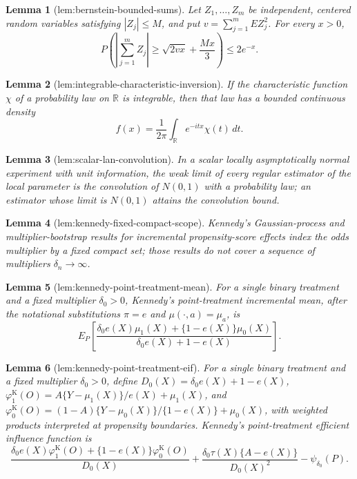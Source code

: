 \documentclass{article}
\newtheorem{lemma}{Lemma}
\begin{document}
\begin{lemma}[lem:bernstein-bounded-sums]\label{lem:bernstein-bounded-sums}
Let \(Z_1,\ldots,Z_m\) be independent, centered random variables satisfying \(|Z_j|\leq M\), and put \(v=\sum_{j=1}^m E Z_j^2\).  For every \(x>0\),
\[
 P\!\left(\left|\sum_{j=1}^m Z_j\right|\geq \sqrt{2vx}+\frac{Mx}{3}\right)\leq 2e^{-x}.
\]
\end{lemma}

\begin{lemma}[lem:integrable-characteristic-inversion]\label{lem:integrable-characteristic-inversion}
If the characteristic function \(\chi\) of a probability law on \(\mathbb R\) is integrable, then that law has a bounded continuous density
\[
 f(x)=\frac{1}{2\pi}\int_{\mathbb R}e^{-itx}\chi(t)\,dt.
\]
\end{lemma}

\begin{lemma}[lem:scalar-lan-convolution]\label{lem:scalar-lan-convolution}
In a scalar locally asymptotically normal experiment with unit information, the weak limit of every regular estimator of the local parameter is the convolution of \(N(0,1)\) with a probability law; an estimator whose limit is \(N(0,1)\) attains the convolution bound.
\end{lemma}

\begin{lemma}[lem:kennedy-fixed-compact-scope]\label{lem:kennedy-fixed-compact-scope}
Kennedy's Gaussian-process and multiplier-bootstrap results for incremental propensity-score effects index the odds multiplier by a fixed compact set; those results do not cover a sequence of multipliers \(\delta_n\to\infty\).
\end{lemma}

\begin{lemma}[lem:kennedy-point-treatment-mean]\label{lem:kennedy-point-treatment-mean}
For a single binary treatment and a fixed multiplier \(\delta_0>0\), Kennedy's point-treatment incremental mean, after the notational substitutions \(\pi=e\) and \(\mu(\cdot,a)=\mu_a\), is
\[
E_P\!\left[
\frac{\delta_0e(X)\mu_1(X)+\{1-e(X)\}\mu_0(X)}
{\delta_0e(X)+1-e(X)}
\right].
\]
\end{lemma}

\begin{lemma}[lem:kennedy-point-treatment-eif]\label{lem:kennedy-point-treatment-eif}
For a single binary treatment and a fixed multiplier \(\delta_0>0\), define \(D_0(X)=\delta_0e(X)+1-e(X)\), \(\varphi_1^{\mathrm K}(O)=A\{Y-\mu_1(X)\}/e(X)+\mu_1(X)\), and \(\varphi_0^{\mathrm K}(O)=(1-A)\{Y-\mu_0(X)\}/\{1-e(X)\}+\mu_0(X)\), with weighted products interpreted at propensity boundaries.  Kennedy's point-treatment efficient influence function is
\[
\frac{\delta_0e(X)\varphi_1^{\mathrm K}(O)+\{1-e(X)\}\varphi_0^{\mathrm K}(O)}{D_0(X)}
+\frac{\delta_0\tau(X)\{A-e(X)\}}{D_0(X)^2}-\psi_{\delta_0}(P).
\]
\end{lemma}
\end{document}

